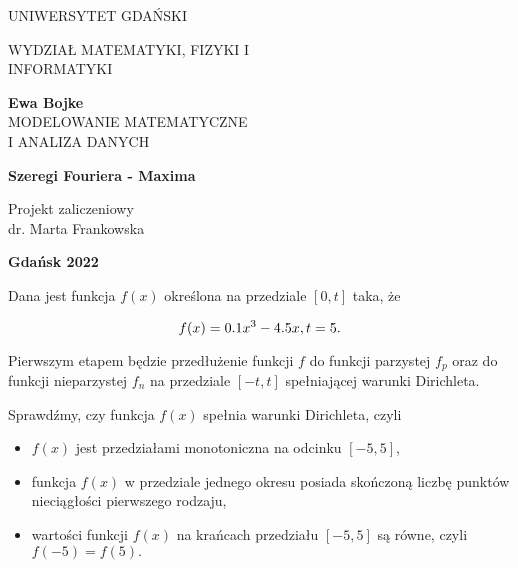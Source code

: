\documentclass[12pt]{article}
\begin{document}
 \begin{center}
\LARGE{UNIWERSYTET GDAŃSKI}
\end{center}

\begin{center}
\LARGE{WYDZIAŁ MATEMATYKI, FIZYKI I\\ INFORMATYKI}
\end{center}


\vspace{50mm}
\begin{center}
\Large{\textbf{Ewa Bojke}}\\ \vskip 4mm
\large{MODELOWANIE MATEMATYCZNE \\I ANALIZA DANYCH}
\vspace{10mm}



\Huge\textbf{Szeregi Fouriera - Maxima} 
\end{center}

\vspace{30mm}

\begin{flushright}
Projekt zaliczeniowy\\ 
dr. Marta Frankowska 
\end{flushright}
\vspace{20mm}
\begin{center}
\textbf{Gdańsk 2022}
\end{center}

\newpage
Dana jest funkcja $f(x)$ określona na przedziale $[0,t]$ taka, że

$$f(x) = 0.1x^3 - 4.5x, \\  t= 5.$$ 

\bigskip

Pierwszym etapem będzie przedłużenie funkcji $f$ do funkcji parzystej $f_p$ oraz do funkcji nieparzystej $f_n$ na przedziale $[-t,t]$ spełniającej warunki Dirichleta.

\smallskip
Sprawdźmy, czy funkcja $f(x)$ spełnia warunki Dirichleta, czyli

\begin{itemize}
    \item $f(x)$ jest przedziałami monotoniczna na odcinku $[-5,5]$,
    \item funkcja ${\displaystyle f(x)}$ w przedziale jednego okresu posiada skończoną liczbę punktów nieciągłości pierwszego rodzaju,
    \item wartości funkcji $f(x)$ na krańcach przedziału $[-5,5]$ są równe, czyli $f(-5) = f(5).$
\end{itemize}
\end{document}
